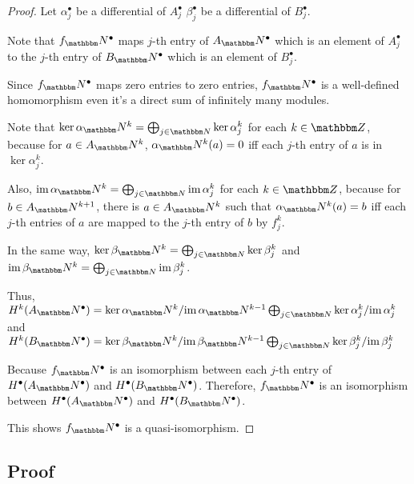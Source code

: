 \begin{proof}
  Let
  \(\alpha_j^\bullet\) be a differential of \(A_j^\bullet\)
  \(\beta_j^\bullet\) be a differential of \(B_j^\bullet\).

  Note that
  \(f_\bbN^\bullet\) maps
  \(j\)-th entry of \(A_\bbN^\bullet\)
  which is an element of \(A_j^\bullet\)
  to the \(j\)-th entry of \(B_\bbN^\bullet\)
  which is an element of \(B_j^\bullet\).

  Since \(f_\bbN^\bullet\) maps zero entries to zero entries,
  \(f_\bbN^\bullet\) is a well-defined homomorphism
  even it's a direct sum of infinitely many modules.

  Note that \(\ker \alpha_\bbN^k = \bigoplus_{j \in \bbN} \ker \alpha_j^k\)
  for each \(k \in \bbZ\),
  because for \(a \in A_\bbN^k\), \(\alpha_\bbN^k(a) = 0\) iff each \(j\)-th entry of \(a\) is in \(\ker \alpha_j^k\).

  Also, \(\im \alpha_\bbN^k = \bigoplus_{j \in \bbN} \im \alpha_j^k\)
  for each \(k \in \bbZ\),
  because for \(b \in A_\bbN^{k+1}\), there is \(a \in A_\bbN^k\)
  such that \(\alpha_\bbN^k(a) = b\)
  iff each \(j\)-th entries of \(a\) are mapped to the \(j\)-th entry of \(b\) by \(f_j^k\).

  In the same way,
  \(\ker \beta_\bbN^k = \bigoplus_{j \in \bbN} \ker \beta_j^k\)
  and
  \(\im \beta_\bbN^k = \bigoplus_{j \in \bbN} \im \beta_j^k\).

  Thus,
  \(H^k(A_\bbN^\bullet)
    = \ker \alpha_\bbN^k / \im \alpha_\bbN^{k-1}
    \bigoplus_{j \in \bbN} \ker \alpha_j^k / \im \alpha_j^k \)
  and
  \(H^k(B_\bbN^\bullet)
    = \ker \beta_\bbN^k / \im \beta_\bbN^{k-1}
    \bigoplus_{j \in \bbN} \ker \beta_j^k / \im \beta_j^k \)

  Because \(f_\bbN^\bullet\) is an isomorphism
  between each \(j\)-th entry of \(H^\bullet(A_\bbN^\bullet)\) and \(H^\bullet(B_\bbN^\bullet)\).
  Therefore, \(f_\bbN^\bullet\) is an isomorphism between \(H^\bullet(A_\bbN^\bullet)\) and \(H^\bullet(B_\bbN^\bullet)\).

  This shows \(f_\bbN^\bullet\) is a quasi-isomorphism.
\end{proof}

\subsection*{Proof}


